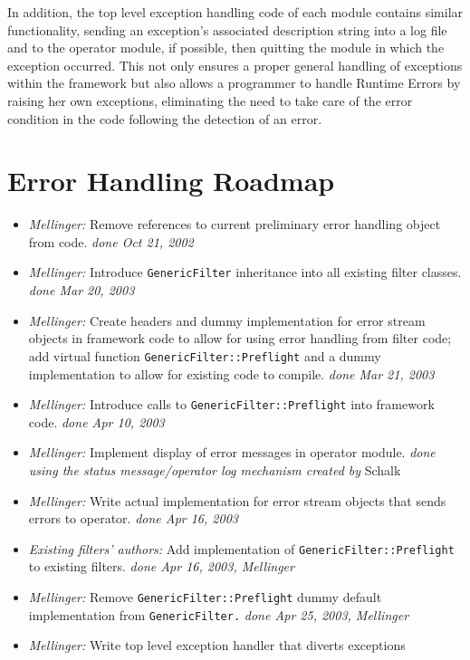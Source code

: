 \documentclass[12pt,letterpaper]{article}
\begin{document}
In addition, the top level exception handling code
of each module contains similar functionality,
sending an exception's associated description string into
a log file and to the operator module, if possible, then
quitting the module in which the exception occurred.
This not only ensures
a proper general handling of exceptions within the framework but
also allows a programmer to handle {Runtime Errors} by raising
her own exceptions, eliminating the need to take care of the error
condition in the code following the detection of an error.

\pagebreak
\section{Error Handling Roadmap}
\begin{flushleft}
\begin{itemize}
\item \textit{Mellinger:} Remove references to current preliminary error handling
object from code.
  \textit{done Oct 21, 2002}
\item \textit{Mellinger:} Introduce \texttt{GenericFilter} inheritance into all
existing filter classes.
  \textit{done Mar 20, 2003}
\item \textit{Mellinger:} Create headers and dummy implementation for error stream
objects in framework code to allow for using error handling from
filter code; add virtual function \texttt{GenericFilter::Preflight}
and a dummy implementation to allow for existing code to compile.
  \textit{done Mar 21, 2003}
\item \textit{Mellinger:} Introduce calls to \texttt{GenericFilter::Preflight} into
framework code.
  \textit{done Apr 10, 2003}
\item \textit{Mellinger:} Implement display of error messages in operator module.
  \textit{done using the status message/operator log mechanism created by} Schalk 
\item \textit{Mellinger:} Write actual implementation for error stream objects that
sends errors to operator.
  \textit{done Apr 16, 2003}
\item \textit{Existing filters' authors:} Add implementation of \texttt{GenericFilter::Preflight} to existing filters.
  \textit{done Apr 16, 2003, Mellinger}
\item \textit{Mellinger:} Remove \texttt{GenericFilter::Preflight} dummy default implementation from \texttt{GenericFilter.}
  \textit{done Apr 25, 2003, Mellinger}
\item \textit{Mellinger:} Write top level exception handler that diverts exceptions

\end{itemize}
\end{flushleft}
\end{document}
